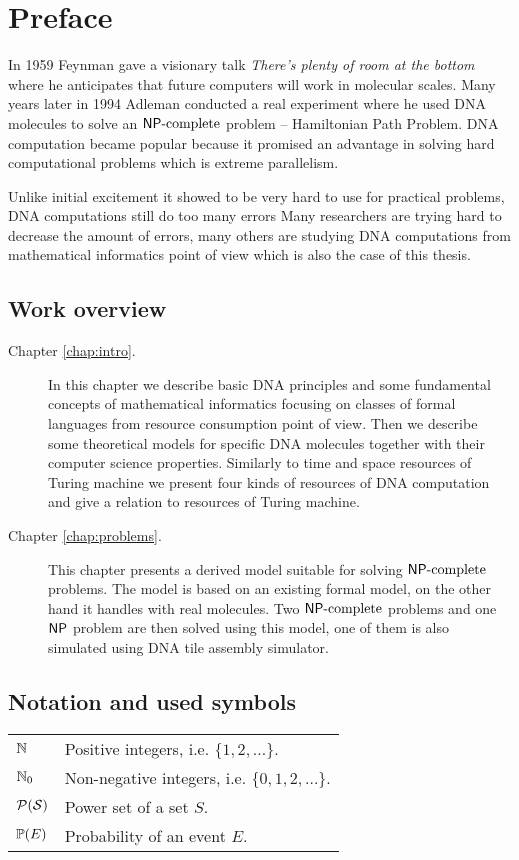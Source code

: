 \cleardoublepage{}   %
\chapter*{Preface}

In 1959 Feynman gave a visionary talk {\em There's plenty of room at the bottom} \cite{feynman} where he anticipates that future computers will work in molecular scales. Many years later in 1994 Adleman conducted a real experiment \cite{adleman94} where he used DNA molecules to solve an $\mathsf{NP}\textnormal{-complete}$ problem -- Hamiltonian Path Problem. DNA computation became popular because it promised an advantage in solving hard computational problems which is extreme parallelism.

Unlike initial excitement it showed to be very hard to use for practical problems, DNA computations still do too many errors %
Many researchers are trying hard to decrease the amount of errors, many others are studying DNA computations from mathematical informatics point of view which is also the case of this thesis.

\section*{Work overview}
	
	\begin{description}
		\item[Chapter \ref{chap:intro}.] In this chapter we describe basic DNA principles and some fundamental concepts of mathematical informatics focusing on classes of formal languages from resource consumption point of view. Then we describe some theoretical models for specific DNA molecules together with their computer science properties. Similarly to time and space resources of Turing machine we present four kinds of resources of DNA computation and give a relation to resources of Turing machine.
		\item[Chapter \ref{chap:problems}.] This chapter presents a derived model suitable for solving $\mathsf{NP}\textnormal{-complete}$ problems. The model is based on an existing formal model, on the other hand it handles with real molecules. Two $\mathsf{NP}\textnormal{-complete}$ problems and one $\mathsf{NP}$ problem are then solved using this model, one of them is also simulated using DNA tile assembly simulator.
	\end{description}

\section*{Notation and used symbols}
	
	\begin{tabularx}{\textwidth}{p{3em} X}
		$\mathbb{N}$ & Positive integers, i.e. $\{1, 2, \ldots\}$.\\
		$\mathbb{N}_0$ & Non-negative integers, i.e. $\{0, 1, 2, \ldots\}$.\\
		$\cal P(S)$ & Power set of a set $S$.\\
		$\mathbb{P}(E)$ & Probability of an event $E$.
	\end{tabularx}
	